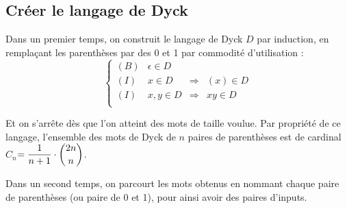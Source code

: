 \subsection{Créer le langage de Dyck}
\label{subsec:logic_to_mot/procede/dyck}
\par
Dans un premier temps, on construit le langage de Dyck $D$ par induction, en remplaçant les parenthèses par des 0 et 1 par commodité d'utilisation :
$$\left\{
\begin{array}{clcr}
(B) & \epsilon \in D & & \\
(I) & x \in D & \Rightarrow & (x) \in D\\
(I) & x, y \in D & \Rightarrow & xy \in D\\
\end{array}
\right.$$
\par
Et on s'arrête dès que l'on atteint des mots de taille voulue. Par propriété de ce langage, l'ensemble des mots de Dyck de $n$ paires de parenthèses est de cardinal $C_n$\protect\footnotemark$ = \dfrac{1}{n+1} \cdot \dbinom{2n}{n}$.
\par
Dans un second temps, on parcourt les mots obtenus en nommant chaque paire de parenthèses (ou paire de 0 et 1), pour ainsi avoir des paires d'inputs.\\

